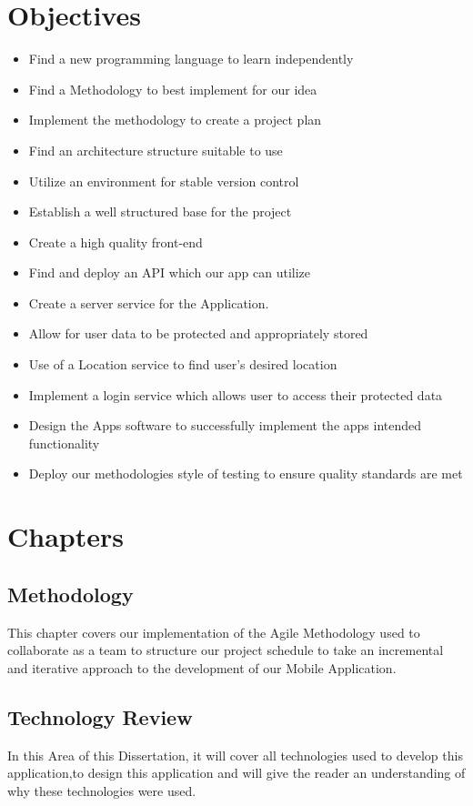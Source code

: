 \section{Objectives}
\begin{itemize}
    \item Find a new programming language to learn independently
    \item Find a Methodology to best implement for our idea
    \item Implement the methodology to create a project plan
    \item Find an architecture structure suitable to use
    \item Utilize an environment for stable version control
    \item Establish a well structured base for the project
    \item Create a high quality front-end
    \item Find and deploy an API which our app can utilize
    \item Create a server service for the Application.
    \item Allow for user data to be protected and appropriately stored
    \item Use of a Location service to find user's desired location
    \item Implement a login service which allows user to access their protected data
    \item Design the Apps software to successfully implement the apps intended functionality
    \item Deploy our methodologies style of testing to ensure quality standards are met

\end{itemize}
\section{Chapters}
\subsection{Methodology}
This chapter covers our implementation of the Agile Methodology used to collaborate as a team to structure our project schedule to take an incremental and iterative approach to the development of our Mobile Application.
\subsection{Technology Review}
In this Area of this Dissertation, it will cover all technologies used to develop this application,to design this application and will give the reader an understanding of why these technologies were used.
